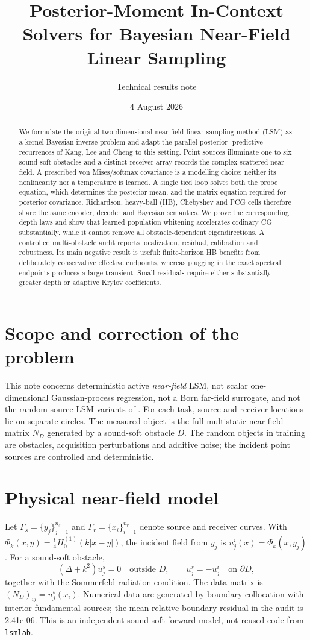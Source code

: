 \documentclass[10pt]{article}
\title{Posterior-Moment In-Context Solvers for Bayesian Near-Field Linear Sampling}
\author{Technical results note}
\date{4 August 2026}
\begin{document}
\maketitle

\begin{abstract}
We formulate the original two-dimensional near-field linear sampling method
(LSM) as a kernel Bayesian inverse problem and adapt the parallel posterior-
predictive recurrences of Kang, Lee and Cheng to this setting.  Point sources
illuminate one to six sound-soft obstacles and a distinct receiver array records
the complex scattered near field.  A prescribed von Mises/softmax covariance is
a modelling choice: neither its nonlinearity nor a temperature is learned.  A
single tied loop solves both the probe equation, which determines the posterior
mean, and the matrix equation required for posterior covariance.  Richardson,
heavy-ball (HB), Chebyshev and PCG cells therefore share the same encoder,
decoder and Bayesian semantics.  We prove the corresponding depth laws and
show that learned population whitening accelerates ordinary CG substantially,
while it cannot remove all obstacle-dependent eigendirections.  A controlled
multi-obstacle audit reports localization,
residual, calibration and robustness.  Its main negative result is useful:
finite-horizon HB benefits from deliberately conservative effective endpoints,
whereas plugging in the exact spectral endpoints produces a large transient.
Small residuals require either substantially greater depth or adaptive Krylov
coefficients.
\end{abstract}

\section{Scope and correction of the problem}
This note concerns deterministic active \emph{near-field} LSM, not scalar
one-dimensional Gaussian-process regression, not a Born far-field surrogate,
and not the random-source LSM variants of \citet{montanelli2022,montanelli2024}.
For each task, source and receiver locations lie on separate circles.  The
measured object is the full multistatic near-field matrix $N_D$ generated by a
sound-soft obstacle $D$.  The random objects in training are obstacles,
acquisition perturbations and additive noise; the incident point sources are
controlled and deterministic.

\section{Physical near-field model}
Let $\Gamma_s=\{y_j\}_{j=1}^{n_s}$ and
$\Gamma_r=\{x_i\}_{i=1}^{n_r}$ denote source and receiver curves.  With
$\Phi_k(x,y)=\tfrac{\mathrm i}{4}H_0^{(1)}(k|x-y|)$, the incident field
from $y_j$ is $u_j^i(x)=\Phi_k(x,y_j)$.  For a sound-soft obstacle,
\[
 (\Delta+k^2)u_j^s=0\quad\text{outside }D,
 \qquad u_j^s=-u_j^i\quad\text{on }\partial D,
\]
together with the Sommerfeld radiation condition.  The data matrix is
$(N_D)_{ij}=u_j^s(x_i)$.  Numerical data are generated by boundary
collocation with interior fundamental sources; the mean relative boundary
residual in the audit is 2.41e-06.  This is an independent sound-soft
forward model, not reused code from \texttt{lsmlab}.
\end{document}
